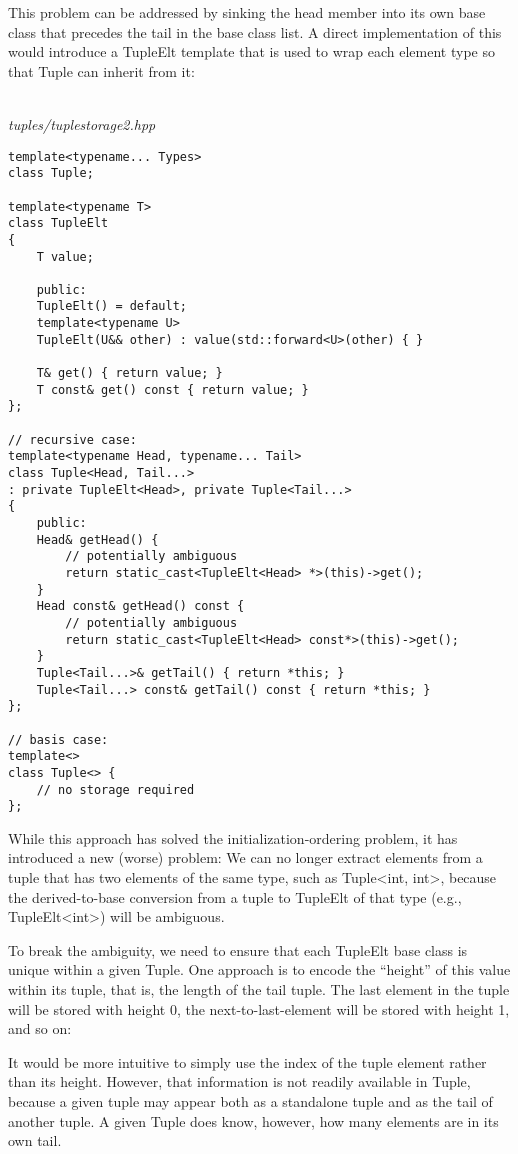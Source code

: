 This problem can be addressed by sinking the head member into its own base class that precedes the tail in the base class list. A direct implementation of this would introduce a TupleElt template that is used to wrap each element type so that Tuple can inherit from it:

\hspace*{\fill} \\ %
\noindent
\textit{tuples/tuplestorage2.hpp}
\begin{lstlisting}[style=styleCXX]
template<typename... Types>
class Tuple;

template<typename T>
class TupleElt
{
	T value;
	
	public:
	TupleElt() = default;
	template<typename U>
	TupleElt(U&& other) : value(std::forward<U>(other) { }
	
	T& get() { return value; }
	T const& get() const { return value; }
};

// recursive case:
template<typename Head, typename... Tail>
class Tuple<Head, Tail...>
: private TupleElt<Head>, private Tuple<Tail...>
{
	public:
	Head& getHead() {
		// potentially ambiguous
		return static_cast<TupleElt<Head> *>(this)->get();
	}
	Head const& getHead() const {
		// potentially ambiguous
		return static_cast<TupleElt<Head> const*>(this)->get();
	}
	Tuple<Tail...>& getTail() { return *this; }
	Tuple<Tail...> const& getTail() const { return *this; }
};

// basis case:
template<>
class Tuple<> {
	// no storage required
};
\end{lstlisting}

While this approach has solved the initialization-ordering problem, it has introduced a new (worse) problem: We can no longer extract elements from a tuple that has two elements of the same type, such as Tuple<int, int>, because the derived-to-base conversion from a tuple to TupleElt of that type (e.g., TupleElt<int>) will be ambiguous.

To break the ambiguity, we need to ensure that each TupleElt base class is unique within a given Tuple. One approach is to encode the “height” of this value within its tuple, that is, the length of the tail tuple. The last element in the tuple will be stored with height 0, the next-to-last-element will be stored with height 1, and so on:

\begin{tcolorbox}[colback=webgreen!5!white,colframe=webgreen!75!black]
\hspace*{0.75cm}It would be more intuitive to simply use the index of the tuple element rather than its height. However, that information is not readily available in Tuple, because a given tuple may appear both as a standalone tuple and as the tail of another tuple. A given Tuple does know, however, how many elements are in its own tail.
\end{tcolorbox}

